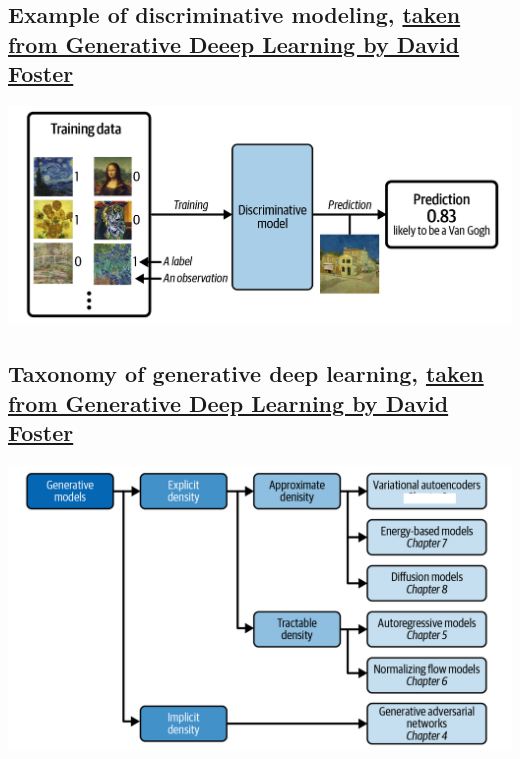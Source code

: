 \documentclass[%
oneside,                 %
final,                   %
10pt]{article}
\begin{document}
\vspace{6mm}

\subsection{Example of discriminative modeling, \href{{https://www.oreilly.com/library/view/generative-deep-learning/9781098134174/ch01.html}}{taken from Generative Deeep Learning by David Foster}}

\vspace{6mm}

\centerline{\includegraphics[width=1.0\linewidth]{figures/standarddeeplearning.png}}

\vspace{6mm}

\subsection{Taxonomy of generative deep learning, \href{{https://www.oreilly.com/library/view/generative-deep-learning/9781098134174/ch01.html}}{taken from Generative Deep Learning by David Foster}}

\vspace{6mm}

\centerline{\includegraphics[width=1.0\linewidth]{figures/generativemodels.png}}
\end{document}
